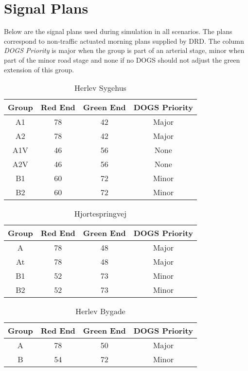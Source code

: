 \section{Signal Plans}
\label{app:signalplans}
Below are the signal plans used during simulation in all scenarios. The plans correspond to non-traffic actuated morning plans supplied by DRD. The column \textit{DOGS Priority} is major when the group is part of an arterial stage, minor when part of the minor road stage and none if no DOGS should not adjust the green extension of this group.

\begin{table}[ht]
\centering
\begin{tabular}{c|c|c|c}
\textbf{Group} & \textbf{Red End} & \textbf{Green End} & \textbf{DOGS Priority}\\ \hline
A1 & 78 & 42 & Major\\
A2 & 78 & 42 & Major\\
A1V & 46 & 56 & None\\
A2V & 46 & 56 & None\\
B1 & 60 & 72 & Minor\\
B2 & 60 & 72 & Minor\\
\end{tabular}
\caption{Herlev Sygehus}
\end{table}



\begin{table}[ht]
\centering
\begin{tabular}{c|c|c|c}
\textbf{Group} & \textbf{Red End} & \textbf{Green End} & \textbf{DOGS Priority}\\ \hline
A & 78 & 48 & Major\\
At & 78 & 48 & Major\\
B1 & 52 & 73 & Minor\\
B2 & 52 & 73 & Minor\\
\end{tabular}
\caption{Hjortespringvej}
\end{table}

\begin{table}[ht]
\centering
\begin{tabular}{c|c|c|c}
\textbf{Group} & \textbf{Red End} & \textbf{Green End} & \textbf{DOGS Priority}\\ \hline
A & 78 & 50 & Major\\
B & 54 & 72 & Minor\\
\end{tabular}
\caption{Herlev Bygade}
\end{table}

